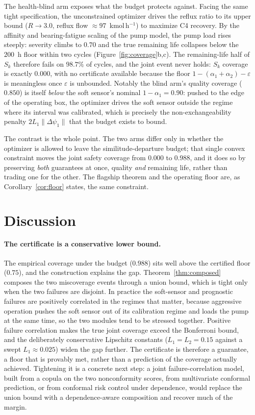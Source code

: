 \documentclass[review,12pt]{elsarticle}
\theoremstyle{definition}
\begin{document}
The health-blind arm exposes what the budget protects against. Facing the same
tight specification, the unconstrained optimizer drives the reflux ratio to its
upper bound ($R\to3.0$, reflux flow $\approx\!97$~kmol\,h$^{-1}$) to maximize C4
recovery. By the affinity and bearing-fatigue scaling of the pump model, the
pump load rises steeply: severity climbs to $0.70$ and the true remaining life
collapses below the $200$~h floor within two cycles
(Figure~\ref{fig:coverage}b,c). The remaining-life half of $S_k$ therefore fails on
$98.7\%$ of cycles, and the joint event never holds: $S_k$ coverage is exactly
$0.000$, with no certificate available because the floor $1-(\alpha_1+\alpha_2)-
\varepsilon$ is meaningless once $\varepsilon$ is unbounded. Notably the blind arm's
quality coverage ($0.850$) is itself \emph{below} the soft sensor's nominal
$1-\alpha_1=0.90$: pushed to the edge of the operating box, the optimizer drives the
soft sensor outside the regime where its interval was calibrated, which is precisely the
non-exchangeability penalty $2L_1\|\Delta\psi_1\|$ that the budget exists to bound.

The contrast is the whole point. The two arms differ only in whether the optimizer
is allowed to leave the similitude-departure budget; that single convex constraint
moves the joint safety coverage from $0.000$ to $0.988$, and it does so by
preserving \emph{both} guarantees at once, quality \emph{and} remaining life,
rather than trading one for the other. The flagship theorem and the operating floor
are, as Corollary~\ref{cor:floor} states, the same constraint.

\section{Discussion}
\label{sec:discussion}

\paragraph{The certificate is a conservative lower bound.}
The empirical coverage under the budget ($0.988$) sits well above the certified floor
($0.75$), and the construction explains the gap. Theorem~\ref{thm:composed} composes the
two miscoverage events through a union bound, which is tight only when the two failures
are disjoint. In practice the soft-sensor and prognostic failures are positively
correlated in the regimes that matter, because aggressive operation pushes the soft
sensor out of its calibration regime and loads the pump at the same time, so the two
modules tend to be stressed together. Positive failure correlation makes the true joint
coverage exceed the Bonferroni bound, and the deliberately conservative Lipschitz
constants ($L_1=L_2=0.15$ against a swept $L_1\approx0.025$) widen the gap further. The
certificate is therefore a guarantee, a floor that is provably met, rather than a
prediction of the coverage actually achieved. Tightening it is a concrete next step: a
joint failure-correlation model, built from a copula on the two nonconformity scores,
from multivariate conformal prediction, or from conformal risk control under dependence,
would replace the union bound with a dependence-aware composition and recover much of the
margin.
\end{document}
